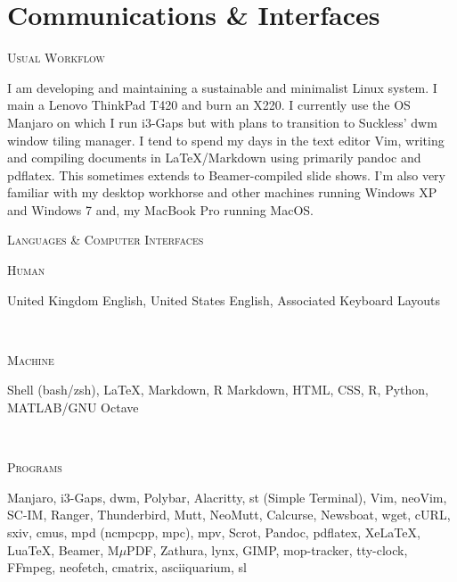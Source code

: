 \documentclass[11pt, english]{article}
\begin{document}
{\section{Communications \& Interfaces}

\begin{center}
	\textsc{Usual Workflow}
\end{center}

I am developing and maintaining a sustainable and minimalist Linux system. I main a Lenovo ThinkPad T420 and burn an X220. I currently use the OS Manjaro on which I run i3-Gaps but with plans to transition to Suckless' dwm window tiling manager. I tend to spend my days in the text editor Vim, writing and compiling documents in {\LaTeX}/Markdown using primarily pandoc and pdflatex. This sometimes extends to Beamer-compiled slide shows. I'm also very familiar with my desktop workhorse and other machines running Windows XP and Windows 7 and, my MacBook Pro running MacOS.

\begin{center}
	\textsc{Languages \& Computer Interfaces}
\end{center}

\begin{minipage}[t]{.15\linewidth}
        \hfill                  
        \textsc{Human}
\end{minipage}
\hfill\vline\hfill
\begin{minipage}[t]{.80\linewidth}
	United Kingdom English, United States English, Associated Keyboard Layouts
\end{minipage}\\

\begin{minipage}[t]{.15\linewidth}
        \hfill                  
        \textsc{Machine}
\end{minipage}
\hfill\vline\hfill
\begin{minipage}[t]{.80\linewidth}
	Shell (bash/zsh), {\LaTeX}, Markdown, R Markdown, HTML, CSS, R, Python, MATLAB/GNU Octave
\end{minipage}\\

\begin{minipage}[t]{.15\linewidth}
        \hfill                  
        \textsc{Programs}    
\end{minipage}
\hfill\vline\hfill
\begin{minipage}[t]{.80\linewidth}
	Manjaro, i3-Gaps, dwm, Polybar, Alacritty, st (Simple Terminal), Vim, neoVim, SC-IM, Ranger, Thunderbird, Mutt, NeoMutt, Calcurse, Newsboat, wget, cURL, sxiv, cmus, mpd (ncmpcpp, mpc), mpv, Scrot, Pandoc, pdflatex, XeLaTeX, LuaTeX, Beamer, M$\mu$PDF, Zathura, lynx, GIMP, mop-tracker, tty-clock, FFmpeg, neofetch, cmatrix, asciiquarium, sl
\end{minipage}\\

}
\end{document}
